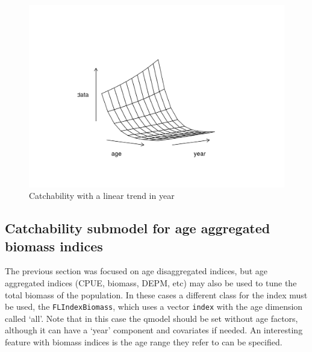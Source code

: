 \documentclass[
]{book}
\newenvironment{Shaded}{\begin{snugshade}}{\end{snugshade}}
\newcommand{\AttributeTok}[1]{\textcolor[rgb]{0.13,0.29,0.53}{#1}}
\newcommand{\DecValTok}[1]{\textcolor[rgb]{0.00,0.00,0.81}{#1}}
\newcommand{\FunctionTok}[1]{\textcolor[rgb]{0.13,0.29,0.53}{\textbf{#1}}}
\newcommand{\NormalTok}[1]{#1}
\newcommand{\OtherTok}[1]{\textcolor[rgb]{0.56,0.35,0.01}{#1}}
\newcommand{\SpecialCharTok}[1]{\textcolor[rgb]{0.81,0.36,0.00}{\textbf{#1}}}
\newcommand{\StringTok}[1]{\textcolor[rgb]{0.31,0.60,0.02}{#1}}
\begin{document}
\begin{Shaded}
\end{Shaded}

\begin{figure}
\centering
\includegraphics{_bookdown_files/_main_files/figure-html/qtrend-1.png}
\caption{\label{fig:qtrend}Catchability with a linear trend in year}
\end{figure}

\hypertarget{catchability-submodel-for-age-aggregated-biomass-indices}{%
\subsection{Catchability submodel for age aggregated biomass indices}\label{catchability-submodel-for-age-aggregated-biomass-indices}}

The previous section was focused on age disaggregated indices, but age aggregated indices (CPUE, biomass, DEPM, etc) may also be used to tune the total biomass of the population. In these cases a different class for the index must be used, the \texttt{FLIndexBiomass}, which uses a vector \texttt{index} with the age dimension called `all'. Note that in this case the qmodel should be set without age factors, although it can have a `year' component and covariates if needed. An interesting feature with biomass indices is the age range they refer to can be specified.
\end{document}
